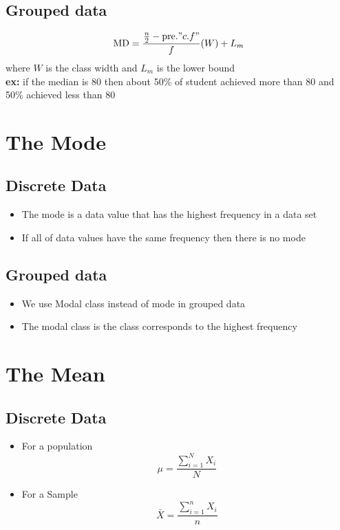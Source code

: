 \documentclass[11pt, a4paper]{article}
\begin{document}
     \subsection{Grouped data}
     $$\text{MD} = \frac{\frac{n}{2} - \text{pre.}"c.f"}{f}(W)+L_m$$
     where $W$ is the class width and $L_m$ is the lower bound \\
     \textbf{ex:} if the median is 80 then about 50\% of student achieved more than 80 and 50\% achieved less than 80 

     \section{The Mode}
     \subsection{Discrete Data}
     \begin{itemize}
        \item The mode is a data value that has the highest frequency in a data set
        \item If all of data values have the same frequency then there is no mode
          
     \end{itemize}
     \subsection{Grouped data}
     \begin{itemize}
         \item We use Modal class instead of mode in grouped data 
         \item The modal class is the class corresponds to the highest frequency
     \end{itemize}


     \section{The Mean}
     \subsection{Discrete Data}
     \begin{itemize}
         \item For a population
         $$\displaystyle \mu = \frac{\sum_{i = 1}^{N} X_i}{N}$$
         \item For a Sample
         $$\displaystyle \bar{X} = \frac{\sum_{i = 1}^{n} X_i}{n}$$
     \end{itemize}
\end{document}
